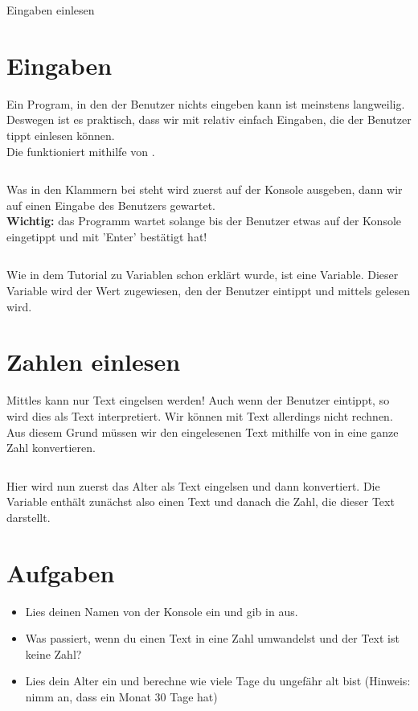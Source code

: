 \documentclass{\VorlagenPfad/coderdojokatext}
\newcommand{\Titel}{Eingaben einlesen}
\begin{document}
\begin{center}
	{\huge \Titel}
\end{center}

\section{Eingaben}
Ein Program, in den der Benutzer nichts eingeben kann ist meinstens langweilig.
Deswegen ist es praktisch, dass wir mit relativ einfach Eingaben, die der Benutzer tippt einlesen können.\\

Die funktioniert mithilfe von .

\inputminted[firstline=1, lastline=2]{python}{../../../Beispiele/eingabe.py}
Was in den Klammern bei  steht wird zuerst auf der Konsole ausgeben, dann wir auf einen Eingabe des Benutzers gewartet.\\
\textbf{Wichtig:} das Programm wartet solange bis der Benutzer etwas auf der Konsole eingetippt und mit 'Enter' bestätigt hat!

\inputminted[firstline=2, lastline=2]{python}{../../../Beispiele/eingabe.py}

Wie in dem Tutorial zu Variablen schon erklärt wurde, ist  eine Variable. Dieser Variable wird der Wert zugewiesen, 
den der Benutzer eintippt und mittels  gelesen wird.

\section{Zahlen einlesen}
Mittles  kann nur Text eingelsen werden! Auch wenn der Benutzer  eintippt, so wird dies als Text  interpretiert.
Wir können mit Text allerdings nicht rechnen. Aus diesem Grund müssen wir den eingelesenen Text mithilfe von  in eine ganze Zahl konvertieren.

\inputminted[firstline=4, lastline=5]{python}{../../../Beispiele/eingabe.py}
Hier wird nun zuerst das Alter als Text eingelsen und dann konvertiert. Die Variable  enthält zunächst also einen Text und danach die Zahl, die dieser Text darstellt.

\section{Aufgaben}
\begin{itemize}
	\item Lies deinen Namen von der Konsole ein und gib in aus.
	\item Was passiert, wenn du einen Text in eine Zahl umwandelst und der Text ist keine Zahl?
	\item Lies dein Alter ein und berechne wie viele Tage du ungefähr alt bist (Hinweis: nimm an, dass ein Monat 30 Tage hat)
\end{itemize}
\end{document}
